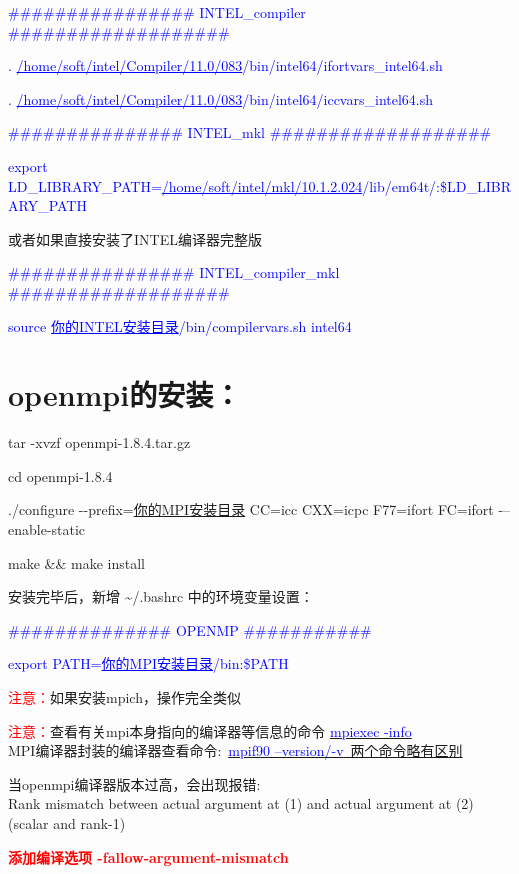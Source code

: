 \documentclass[10pt,a4paper]{article}
\begin{document}
\textcolor{blue}{\#\#\#\#\#\#\#\#\#\#\#\#\#\#\#\# INTEL\_compiler \#\#\#\#\#\#\#\#\#\#\#\#\#\#\#\#\#\#\#}

\textcolor{blue}{. \underline{/home/soft/intel/Compiler/11.0/083}/bin/intel64/ifortvars\_intel64.sh}

\textcolor{blue}{. \underline{/home/soft/intel/Compiler/11.0/083}/bin/intel64/iccvars\_intel64.sh}

\textcolor{blue}{\#\#\#\#\#\#\#\#\#\#\#\#\#\#\# INTEL\_mkl \#\#\#\#\#\#\#\#\#\#\#\#\#\#\#\#\#\#\#}

\textcolor{blue}{export LD\_LIBRARY\_PATH=\underline{/home/soft/intel/mkl/10.1.2.024}/lib/em64t/:\$LD\_LIBRARY\_PATH}

或者如果直接安装了INTEL编译器完整版

\textcolor{blue}{\#\#\#\#\#\#\#\#\#\#\#\#\#\#\#\# INTEL\_compiler\_mkl \#\#\#\#\#\#\#\#\#\#\#\#\#\#\#\#\#\#\#}

\textcolor{blue}{source \underline{你的INTEL安装目录}/bin/compilervars.sh intel64}

\section{openmpi的安装：}
tar -xvzf openmpi-1.8.4.tar.gz

cd openmpi-1.8.4

./configure -\/-prefix=\underline{你的MPI安装目录} CC=icc CXX=icpc F77=ifort FC=ifort -\/--enable-static

make \&\& make install

安装完毕后，新增 \~\//.bashrc 中的环境变量设置：

\textcolor{blue}{\#\#\#\#\#\#\#\#\#\#\#\#\#\# OPENMP \#\#\#\#\#\#\#\#\#\#\#}

\textcolor{blue}{export PATH=\underline{你的MPI安装目录}/bin:\$PATH}


\textcolor{red}{注意：}如果安装mpich，操作完全类似

\textcolor{red}{注意：}查看有关mpi本身指向的编译器等信息的命令 \underline{\textcolor{blue}{mpiexec -info}}\\
\textrm{MPI编译器封装的编译器查看命令}:~\underline{\textcolor{blue}{mpif90 --version/-v}~两个命令略有区别}

当\textrm{openmpi}编译器版本过高，会出现报错:\\
\textrm{Rank mismatch between actual argument at (1) and actual argument at (2) (scalar and rank-1)}

\textcolor{red}{\textbf{添加编译选项 -fallow-argument-mismatch}}
\end{document}
